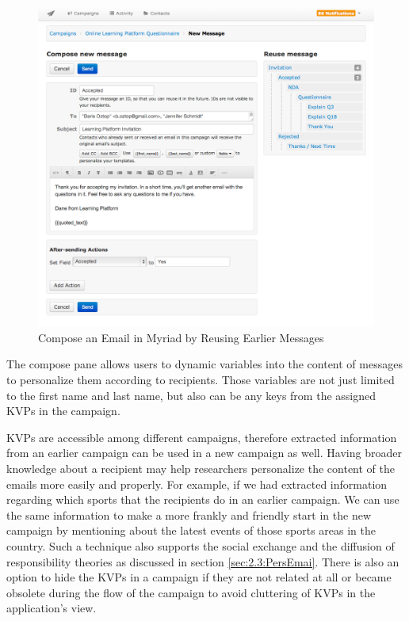 \begin{figure}[htbp]
	\centering
	\includegraphics[width=1.00\textwidth]{imgs/ComposeEmail.png}
	\caption[Compose an Email in Myriad by Reusing Earlier Messages]{Compose an Email in Myriad by Reusing Earlier Messages}
	\label{fig:ComposeEmail}
\end{figure}

The compose pane allows users to dynamic variables into the content of messages to personalize them according to recipients. Those variables are not just limited to the first name and last name, but also can be any keys from the assigned \ac{KVP}s in the campaign.
\vspace{1cm}

\ac{KVP}s are accessible among different campaigns, therefore extracted information from an earlier campaign can be used in a new campaign as well. Having broader knowledge about a recipient may help  researchers personalize the content of the emails more easily and properly. For example, if we had extracted information regarding which sports that the recipients do in an earlier campaign. We can use the same information to make a more frankly and friendly start in the new campaign by mentioning about the latest events of those sports areas in the country. Such a technique also supports the social exchange and the diffusion of responsibility theories as discussed in section \ref{sec:2.3:PersEmai}. There is also an option to hide the \ac{KVP}s in a campaign if they are not related at all or became obsolete during the flow of the campaign to avoid cluttering of \ac{KVP}s in the application's view.
\vspace{1cm}

